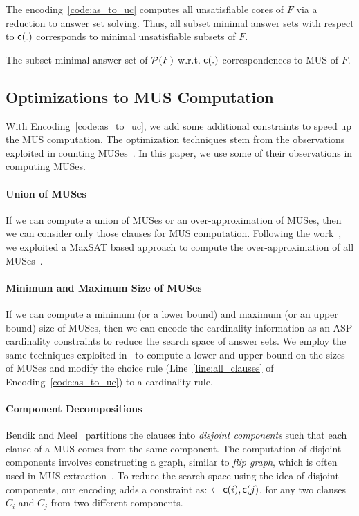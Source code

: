 The encoding~\ref{code:as_to_uc} computes all unsatisfiable cores of $F$ via a reduction to answer set solving. Thus, all subset minimal answer sets 
with respect to $\mathsf{c}(.)$ corresponds to minimal unsatisfiable subsets of $F$.
\begin{proposition}
The subset minimal answer set of $\mathcal{P}(F)$ w.r.t. $\mathsf{c}(.)$ correspondences to MUS of $F$.
\end{proposition}

\subsection{Optimizations to MUS Computation}
With Encoding~\ref{code:as_to_uc}, we add some additional constraints to speed up the MUS computation. 
The optimization techniques stem from the observations exploited in counting MUSes~\cite{BM2021}.
In this paper, we use some of their observations in computing MUSes. 

\paragraph{Union of MUSes}
If we can compute a union of MUSes or an over-approximation of MUSes, 
then we can consider only those clauses for MUS computation. 
Following the work~\cite{BM2021}, we exploited a MaxSAT based approach to compute the over-approximation of all MUSes~\cite{MIMML2014}.   

\paragraph{Minimum and Maximum Size of MUSes}
If we can compute a minimum (or a lower bound) and maximum (or an upper bound) size of MUSes, then we can encode the cardinality information as an ASP cardinality constraints to reduce the search space of answer sets. 
We employ the same techniques exploited in~\cite{BM2021} to compute a lower and upper bound on the sizes of MUSes and modify the choice rule (Line~\ref{line:all_clauses} of Encoding~\ref{code:as_to_uc}) to a cardinality rule. 

\paragraph{Component Decompositions}
Bendik and Meel~\cite{BM2021} partitions the clauses into {\em disjoint components} such that each clause of a MUS comes from the same component. 
The computation of disjoint components involves constructing a graph, similar to {\em flip graph}, which is often used in MUS extraction~\cite{Wieringa2012}.
To reduce the search space using the idea of disjoint components, our encoding adds a constraint as: $\leftarrow \mathsf{c}(i), \mathsf{c}(j)$, for any two clauses $C_i$ and $C_j$ from two different components.   

